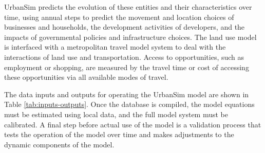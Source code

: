 UrbanSim predicts the evolution of these entities and their characteristics over time, using annual steps to predict the movement and location choices of businesses and households, the development activities of developers, and the impacts of governmental policies and infrastructure choices.  The land use model is interfaced with a metropolitan travel model system to deal with the interactions of land use and transportation. Access to opportunities, such as employment or shopping, are measured by the travel time or cost of accessing these opportunities via all available modes of travel.

The data inputs and outputs for operating the UrbanSim model are shown in Table \ref{tab:inputs-outputs}.  Once the database is compiled, the model equations must be estimated using local data, and the full model system must be calibrated.  A final step before actual use of the model is a validation process that tests the operation of the model over time and makes adjustments to the dynamic components of the model.  

